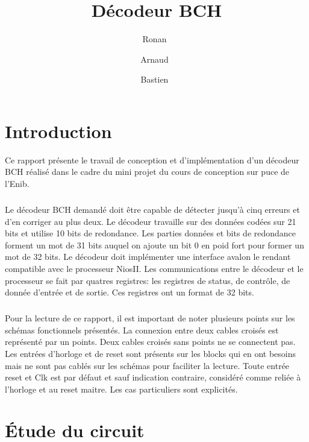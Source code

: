\documentclass[a4paper, 11pt, svgnames]{report}
\title{Décodeur BCH}
\author{Ronan~\bsc{Le Guillou} \and Arnaud~\bsc{Levaufre} \and Bastien~\bsc{Orivel}}
\begin{document}
    \maketitle
    \tableofcontents
    \printglossaries
    \listoffigures
    \listoftables

    \chapter{Introduction}

    Ce rapport présente le travail de conception et d'implémentation d'un
    décodeur BCH réalisé dans le cadre du mini projet du cours de conception
    sur puce de l'Enib.

    \paragraph{}
    Le décodeur BCH demandé doit être capable de détecter jusqu'à cinq erreurs
    et d'en corriger au plus deux. Le décodeur travaille sur des données codées
    sur 21 bits et utilise 10 bits de redondance. Les parties données et bits de
    redondance forment un mot de 31 bits auquel on ajoute un bit 0 en poid fort
    pour former un mot de 32 bits. Le décodeur doit implémenter une interface
    avalon le rendant compatible avec le processeur NiosII. Les communications
    entre le décodeur et le processeur se fait par quatres registres: les
    registres de status, de contrôle, de donnée d'entrée et de sortie. Ces
    registres ont un format de 32 bits.

    \paragraph{}
    Pour la lecture de ce rapport, il est important de noter plusieurs points
    sur les schémas fonctionnels présentés. La connexion entre deux cables
    croisés est représenté par un points. Deux cables croisés sans points ne se
    connectent pas. Les entrées d'horloge et de reset sont présents sur les
    blocks qui en ont besoins mais ne sont pas cablés sur les schémas pour
    faciliter la lecture. Toute entrée reset et Clk est par défaut et sauf
    indication contraire, considéré comme reliée à l'horloge et au reset
    maitre. Les cas particuliers sont explicités.

    \chapter{Étude du circuit}
\end{document}
